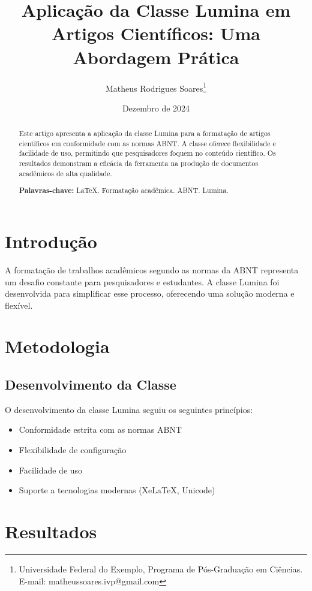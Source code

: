\documentclass[
    fonte=Arial,           %
    layout=article,        %
    nbr6024=2012          %
]{lumina}
\title{Aplicação da Classe Lumina em Artigos Científicos: Uma Abordagem Prática}
\author{Matheus Rodrigues Soares\thanks{Universidade Federal do Exemplo, Programa de Pós-Graduação em Ciências. E-mail: matheussoares.ivp@gmail.com}}
\date{Dezembro de 2024}
\begin{document}
\maketitle

\begin{abstract}
Este artigo apresenta a aplicação da classe Lumina para a formatação de artigos científicos em conformidade com as normas ABNT. A classe oferece flexibilidade e facilidade de uso, permitindo que pesquisadores foquem no conteúdo científico. Os resultados demonstram a eficácia da ferramenta na produção de documentos acadêmicos de alta qualidade.

\textbf{Palavras-chave:} LaTeX. Formatação acadêmica. ABNT. Lumina.
\end{abstract}

\section{Introdução}

\lipsum[1]

A formatação de trabalhos acadêmicos segundo as normas da ABNT representa um desafio constante para pesquisadores e estudantes. A classe Lumina foi desenvolvida para simplificar esse processo, oferecendo uma solução moderna e flexível.

\section{Metodologia}

\lipsum[2-3]

\subsection{Desenvolvimento da Classe}

O desenvolvimento da classe Lumina seguiu os seguintes princípios:

\begin{itemize}
    \item Conformidade estrita com as normas ABNT
    \item Flexibilidade de configuração
    \item Facilidade de uso
    \item Suporte a tecnologias modernas (XeLaTeX, Unicode)
\end{itemize}

\section{Resultados}
\end{document}
